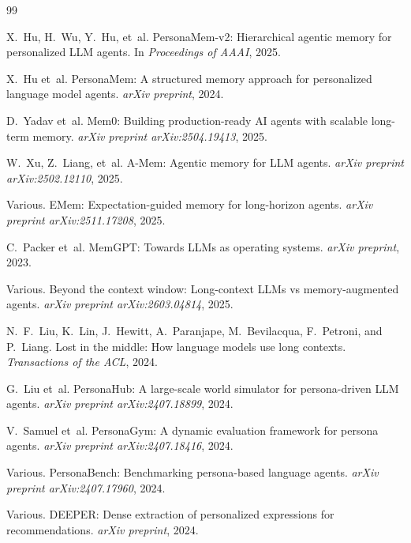 \documentclass[manuscript,screen,review]{acmart}
\begin{document}
\begin{thebibliography}{99}

X.~Hu, H.~Wu, Y.~Hu, et~al.
\newblock PersonaMem-v2: Hierarchical agentic memory for personalized {LLM} agents.
\newblock In \textit{Proceedings of AAAI}, 2025.

X.~Hu et~al.
\newblock PersonaMem: A structured memory approach for personalized language model agents.
\newblock \textit{arXiv preprint}, 2024.

D.~Yadav et~al.
\newblock Mem0: Building production-ready {AI} agents with scalable long-term memory.
\newblock \textit{arXiv preprint arXiv:2504.19413}, 2025.

W.~Xu, Z.~Liang, et~al.
\newblock A-Mem: Agentic memory for {LLM} agents.
\newblock \textit{arXiv preprint arXiv:2502.12110}, 2025.

Various.
\newblock EMem: Expectation-guided memory for long-horizon agents.
\newblock \textit{arXiv preprint arXiv:2511.17208}, 2025.

C.~Packer et~al.
\newblock MemGPT: Towards {LLMs} as operating systems.
\newblock \textit{arXiv preprint}, 2023.

Various.
\newblock Beyond the context window: Long-context {LLMs} vs memory-augmented agents.
\newblock \textit{arXiv preprint arXiv:2603.04814}, 2025.

N.~F.~Liu, K.~Lin, J.~Hewitt, A.~Paranjape, M.~Bevilacqua, F.~Petroni, and P.~Liang.
\newblock Lost in the middle: How language models use long contexts.
\newblock \textit{Transactions of the ACL}, 2024.

G.~Liu et~al.
\newblock PersonaHub: A large-scale world simulator for persona-driven {LLM} agents.
\newblock \textit{arXiv preprint arXiv:2407.18899}, 2024.

V.~Samuel et~al.
\newblock PersonaGym: A dynamic evaluation framework for persona agents.
\newblock \textit{arXiv preprint arXiv:2407.18416}, 2024.

Various.
\newblock PersonaBench: Benchmarking persona-based language agents.
\newblock \textit{arXiv preprint arXiv:2407.17960}, 2024.

Various.
\newblock DEEPER: Dense extraction of personalized expressions for recommendations.
\newblock \textit{arXiv preprint}, 2024.


\end{thebibliography}
\end{document}
